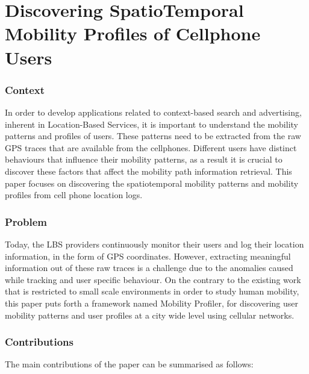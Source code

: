 \newpage
\section{Discovering SpatioTemporal Mobility Profiles of Cellphone Users~\cite{5282489}} \label{lect3}

\subsubsection*{Context}

In order to develop applications related to context-based search and advertising, inherent
in Location-Based Services, it is important to understand the mobility patterns and profiles of
users. These patterns need to be extracted from the raw GPS traces that are available from the 
cellphones. Different users have distinct behaviours that influence their mobility patterns, as 
a result it is crucial to discover these factors that affect the mobility path information
retrieval. This paper focuses on discovering the spatiotemporal mobility patterns and mobility
profiles from cell phone location logs.  
   
\subsubsection*{Problem}

Today, the LBS providers continuously monitor their users and log their location information, in 
the form of GPS coordinates. However, extracting meaningful information out of these raw traces is
a challenge due to the anomalies caused while tracking and user specific behaviour. On the 
contrary to the existing work that is restricted to small scale environments in order to 
study human mobility, this paper puts forth a framework named Mobility Profiler, for discovering user
mobility patterns and user profiles at a city wide level using cellular networks.  

\subsubsection*{Contributions}

The main contributions of the paper can be summarised as follows:

